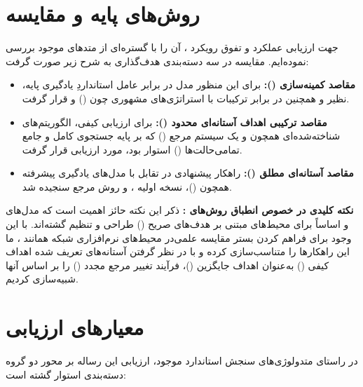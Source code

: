 \documentclass[oneside,openany,phd]{TMU-Thesis}
\begin{document}
\section{روش‌های پایه و مقایسه}

جهت ارزیابی عملکرد و تفوق رویکرد ، آن را با گستره‌ای از متدهای موجود بررسی نموده‌ایم. مقایسه در سه دسته‌بندی هدف‌گذاری به شرح زیر صورت گرفت:

\begin{itemize}
    \item \textbf{مقاصد کمینه‌سازی ():} برای این منظور مدل در برابر عامل استانداردِ یادگیری پایه، نظیر  و همچنین در برابر ترکیبات  با استراتژی‌های مشهوری چون  () و  قرار گرفت. 
    \item \textbf{مقاصد ترکیبی اهداف آستانه‌ای محدود ():} برای ارزیابی کیفی، الگوریتم‌های شناخته‌شده‌ای همچون  و یک سیستم مرجع () که بر پایه جستجوی کامل و جامع تمامی‌حالت‌ها () استوار بود، مورد ارزیابی قرار گرفت.
    \item \textbf{مقاصد آستانه‌ای مطلق ():} راهکار پیشنهادی در تقابل با مدل‌های یادگیری پیشرفته همچون  ()، نسخه اولیه ،  و روش مرجع سنجیده شد.
\end{itemize}

\textbf{نکته کلیدی در خصوص انطباق روش‌های :} ذکر این نکته حائز اهمیت است که مدل‌های  و  اساساً برای محیط‌های مبتنی بر هدف‌های صریح () طراحی و تنظیم گشته‌اند. با این وجود برای فراهم کردن بستر مقایسه علمی‌در محیط‌های نرم‌افزاری شبکه همانند ، ما این راهکارها را متناسب‌سازی کرده و با در نظر گرفتن آستانه‌های تعریف شده اهداف کیفی () به‌عنوان اهداف جایگزین ()، فرآیند تغییر مرجع مجدد () را بر اساس آنها شبیه‌سازی کردیم.

\section{معیارهای ارزیابی}

در راستای متدولوژی‌های سنجش استاندارد موجود، ارزیابی این رساله بر محور دو گروه دسته‌بندی استوار گشته است:
\end{document}
